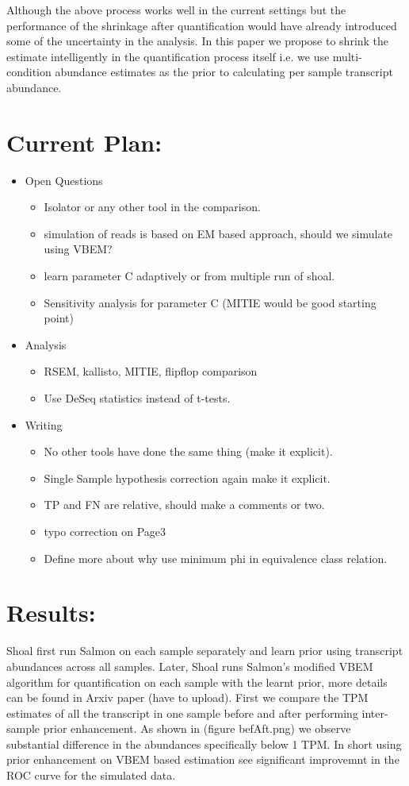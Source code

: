 \documentclass{article}
\begin{document}
Although the above process works well in the current settings but the performance of the shrinkage after quantification would have
already introduced some of the uncertainty in the analysis. In this paper we propose to shrink the estimate intelligently in the
quantification process itself i.e. we use multi-condition abundance estimates as the prior to calculating per sample transcript abundance. 


\section{Current Plan:}
\begin{itemize}
	\item Open Questions
		\begin{itemize}
			\item Isolator or any other tool in the comparison.
			\item simulation of reads is based on EM based approach, should we simulate using VBEM?
			\item learn parameter C adaptively or from multiple run of shoal.
			\item Sensitivity analysis for parameter C (MITIE would be good starting point)
		\end{itemize}
	\item Analysis
	\begin{itemize}
		\item RSEM, kallisto, MITIE, flipflop comparison
		\item Use DeSeq statistics instead of t-tests.
	\end{itemize}
	\item Writing
	\begin{itemize}
		\item No other tools have done the same thing (make it explicit).
		\item Single Sample hypothesis correction again make it explicit.
		\item TP and FN are relative, should make a comments or two.
		\item typo correction on Page3
		\item Define more about why use minimum phi in equivalence class relation.
	\end{itemize}
\end{itemize}

\section{Results:}
Shoal first run Salmon on each sample separately and learn prior using transcript abundances across all samples. Later, Shoal runs Salmon's modified VBEM algorithm for quantification on each sample with the learnt prior, more details can be found in Arxiv paper (have to upload). First we compare the TPM estimates of all the transcript in one sample before and after performing inter-sample prior enhancement. As shown in (figure befAft.png) we observe substantial difference in the abundances specifically below 1 TPM. In short using prior enhancement on VBEM based estimation see significant improvemnt in the ROC curve for the simulated data. 
\end{document}
